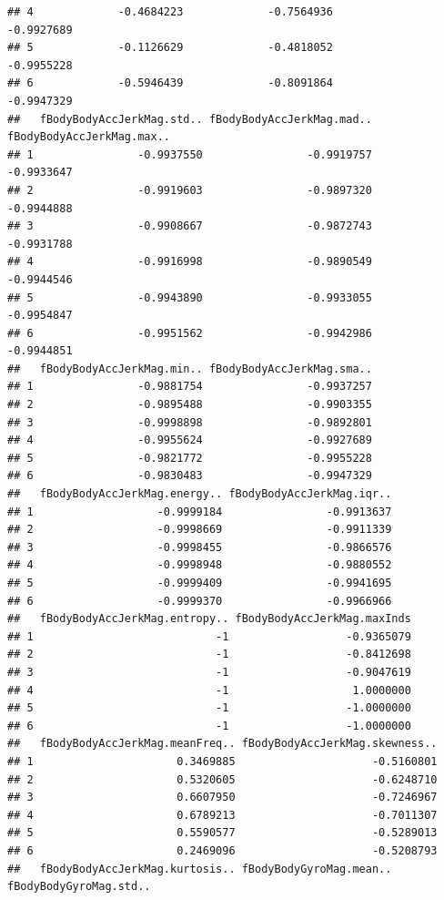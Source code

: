 \documentclass[
]{article}
\begin{document}
\begin{verbatim}
## 4             -0.4684223             -0.7564936                 -0.9927689
## 5             -0.1126629             -0.4818052                 -0.9955228
## 6             -0.5946439             -0.8091864                 -0.9947329
##   fBodyBodyAccJerkMag.std.. fBodyBodyAccJerkMag.mad.. fBodyBodyAccJerkMag.max..
## 1                -0.9937550                -0.9919757                -0.9933647
## 2                -0.9919603                -0.9897320                -0.9944888
## 3                -0.9908667                -0.9872743                -0.9931788
## 4                -0.9916998                -0.9890549                -0.9944546
## 5                -0.9943890                -0.9933055                -0.9954847
## 6                -0.9951562                -0.9942986                -0.9944851
##   fBodyBodyAccJerkMag.min.. fBodyBodyAccJerkMag.sma..
## 1                -0.9881754                -0.9937257
## 2                -0.9895488                -0.9903355
## 3                -0.9998898                -0.9892801
## 4                -0.9955624                -0.9927689
## 5                -0.9821772                -0.9955228
## 6                -0.9830483                -0.9947329
##   fBodyBodyAccJerkMag.energy.. fBodyBodyAccJerkMag.iqr..
## 1                   -0.9999184                -0.9913637
## 2                   -0.9998669                -0.9911339
## 3                   -0.9998455                -0.9866576
## 4                   -0.9998948                -0.9880552
## 5                   -0.9999409                -0.9941695
## 6                   -0.9999370                -0.9966966
##   fBodyBodyAccJerkMag.entropy.. fBodyBodyAccJerkMag.maxInds
## 1                            -1                  -0.9365079
## 2                            -1                  -0.8412698
## 3                            -1                  -0.9047619
## 4                            -1                   1.0000000
## 5                            -1                  -1.0000000
## 6                            -1                  -1.0000000
##   fBodyBodyAccJerkMag.meanFreq.. fBodyBodyAccJerkMag.skewness..
## 1                      0.3469885                     -0.5160801
## 2                      0.5320605                     -0.6248710
## 3                      0.6607950                     -0.7246967
## 4                      0.6789213                     -0.7011307
## 5                      0.5590577                     -0.5289013
## 6                      0.2469096                     -0.5208793
##   fBodyBodyAccJerkMag.kurtosis.. fBodyBodyGyroMag.mean.. fBodyBodyGyroMag.std..

\end{verbatim}
\end{document}
